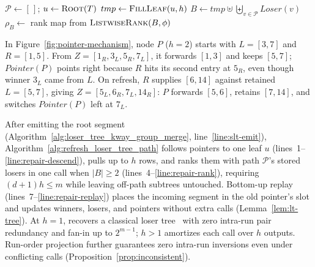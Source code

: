 \begin{algorithm}[t]
\caption{Pointer-Guided Path Refresh}
\label{alg:refresh_loser_tree_path}
$\mathcal P\gets[\,]$; $u\gets\textsc{Root}(T)$\;
$tmp\gets\textsc{FillLeaf}(u,h)$\;
$B\gets tmp\uplus\biguplus_{v\in\mathcal P}\mathit{Loser}(v)$\;
$\rho_B\gets$ rank map from $\textsc{ListwiseRank}(B,\phi)$\;
\;
\end{algorithm}

\begin{example}\label{ex:pointer}
In Figure~\ref{fig:pointer-mechanism}, node $P$ ($h{=}2$) starts with $L=[3,7]$ and $R=[1,5]$. From $Z=[1_R,3_L,5_R,7_L]$, it forwards $[1,3]$ and keeps $[5,7]$; $\mathit{Pointer}(P)$ points right because $R$ hits its second entry at $5_R$, even though winner $3_L$ came from $L$. On refresh, $R$ supplies $[6,14]$ against retained $L=[5,7]$, giving $Z=[5_L,6_R,7_L,14_R]$: $P$ forwards $[5,6]$, retains $[7,14]$, and switches $\mathit{Pointer}(P)$ left at $7_L$.
\end{example}

After emitting the root segment (Algorithm~\ref{alg:loser_tree_kway_group_merge}, line~\ref{line:slt-emit}), Algorithm~\ref{alg:refresh_loser_tree_path} follows pointers to one leaf $u$ (lines~1--\ref{line:repair-descend}), pulls up to $h$ rows, and ranks them with path $\mathcal{P}$'s stored losers in one call when $|B|\ge 2$ (lines~4--\ref{line:repair-rank}), requiring $(d+1)h \le m$ while leaving off-path subtrees untouched. Bottom-up replay (lines~7--\ref{line:repair-replay}) places the incoming segment in the old pointer's slot and updates winners, losers, and pointers without extra calls (Lemma~\ref{lem:lt-tree}). At $h{=}1$, \LT{} recovers a classical loser tree~\cite{DBLP:journals/csur/Graefe06} with zero intra-run pair redundancy and fan-in up to $2^{m-1}$; $h>1$ amortizes each call over $h$ outputs. Run-order projection further guarantees zero intra-run inversions even under conflicting calls (Proposition~\ref{prop:inconsistent}).

